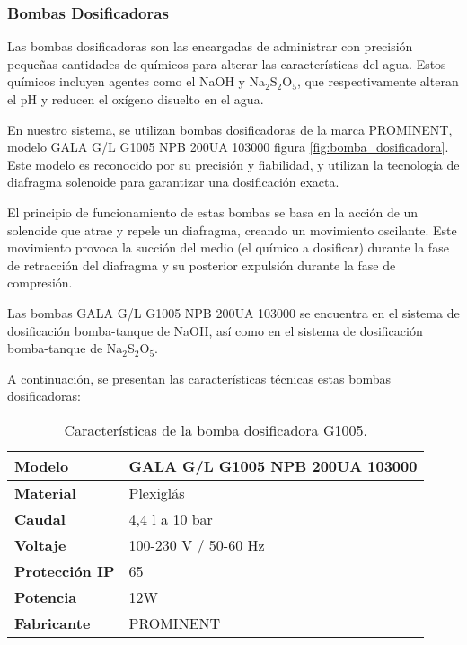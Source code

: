 \subsubsection{Bombas Dosificadoras}

Las bombas dosificadoras son las encargadas de administrar con precisión pequeñas
cantidades de químicos para alterar las características del agua. Estos químicos incluyen
agentes como el NaOH y Na$_2$S$_2$O$_5$, que respectivamente alteran el pH y reducen el oxígeno disuelto en el agua.

En nuestro sistema, se utilizan bombas dosificadoras de la marca PROMINENT, modelo GALA G/L G1005 NPB 200UA 103000
figura \ref{fig:bomba_dosificadora}. Este modelo
es reconocido por su precisión y fiabilidad, y utilizan la tecnología de diafragma
solenoide para garantizar una dosificación exacta.

El principio de funcionamiento de estas bombas se basa en la acción de un solenoide que atrae y repele un diafragma, creando un movimiento oscilante. Este movimiento provoca la succión del medio (el químico a dosificar) durante la fase de retracción del diafragma y su posterior expulsión durante la fase de compresión.

Las bombas GALA G/L G1005 NPB 200UA 103000 se encuentra en el sistema de dosificación bomba-tanque de NaOH, así como en el sistema de dosificación bomba-tanque de Na$_2$S$_2$O$_5$.



A continuación, se presentan las características técnicas estas bombas dosificadoras:\\

\begin{table}[H]
    \centering
    \caption{Características de la bomba dosificadora G1005.}
    \label{table:bomba_dosificadora}
    \begin{tabular}{| L{6cm} | L{6cm} |}
        \hline
        \textbf{Modelo}        & GALA G/L G1005 NPB 200UA 103000 \\
        \hline
        \textbf{Material}      & Plexiglás                       \\
        \hline
        \textbf{Caudal}        & 4,4 l a 10 bar                  \\
        \hline
        \textbf{Voltaje}       & 100-230 V / 50-60 Hz            \\
        \hline
        \textbf{Protección IP} & 65                              \\
        \hline
        \textbf{Potencia}      & 12W                             \\
        \hline
        \textbf{Fabricante}    & PROMINENT                       \\
        \hline
    \end{tabular}
\end{table}

